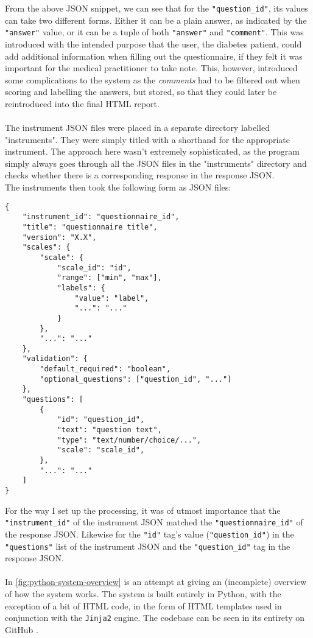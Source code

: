\noindent
From the above JSON snippet, we can see that for the \texttt{"question_id"}, its values can take two different forms. Either it can be a plain answer, as indicated by the \texttt{"answer"} value, or it can be a tuple of both \texttt{"answer"} and \texttt{"comment"}. This was introduced with the intended purpose that the user, the diabetes patient, could add additional information when filling out the questionnaire, if they felt it was important for the medical practitioner to take note. This, however, introduced some complications to the system as the \emph{comments} had to be filtered out when scoring and labelling the answers, but stored, so that they could later be reintroduced into the final HTML report.
\\
\\
The instrument JSON files were placed in a separate directory labelled "instruments". They were simply titled with a shorthand for the appropriate instrument. The approach here wasn't extremely sophisticated, as the program simply always goes through all the JSON files in the "instruments" directory and checks whether there is a corresponding response in the response JSON.
\\
The instruments then took the following form as JSON files:
\begin{verbatim}
{
    "instrument_id": "questionnaire_id",
    "title": "questionnaire title",
    "version": "X.X",
    "scales": {
        "scale": {
            "scale_id": "id",
            "range": ["min", "max"],
            "labels": {
                "value": "label",
                "...": "..."
            }
        },
        "...": "..."
    },
    "validation": {
        "default_required": "boolean",
        "optional_questions": ["question_id", "..."]
    },
    "questions": [
        {
            "id": "question_id",
            "text": "question text",
            "type": "text/number/choice/...",
            "scale": "scale_id",
        },
        "...": "..."
    ]
}
\end{verbatim}

\noindent
For the way I set up the processing, it was of utmost importance that the \texttt{"instrument_id"} of the instrument JSON matched the \texttt{"questionnaire_id"} of the response JSON. Likewise for the \texttt{"id"} tag's value (\texttt{"question_id"}) in the \texttt{"questions"} list of the instrument JSON and the \texttt{"question_id"} tag in the response JSON.
\\
\\
In \autoref{fig:python-system-overview} is an attempt at giving an (incomplete) overview of how the system works. The system is built entirely in Python, with the exception of a bit of HTML code, in the form of HTML templates used in conjunction with the \texttt{Jinja2} engine. The codebase can be seen in its entirety on GitHub .

